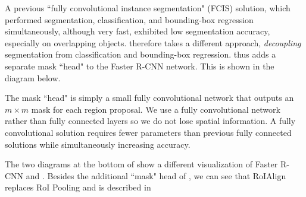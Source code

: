 A previous ``fully convolutional instance segmentation" (FCIS) solution, which performed segmentation, classification, and bounding-box regression simultaneously, although very fast, exhibited low segmentation accuracy, especially on overlapping objects. \maskrcnn therefore takes a different approach, \textit{decoupling} segmentation from classification and bounding-box regression. \maskrcnn thus adds a separate mask ``head" to the Faster R-CNN network. This is shown in the diagram below.

The mask ``head" is simply a small fully convolutional network that outputs an $m\times m$ mask for each region proposal. We use a fully convolutional network rather than fully connected layers so we do not lose spatial information. A fully convolutional solution requires fewer parameters than previous fully connected solutions while simultaneously increasing accuracy.

The two diagrams at the bottom of  show a different visualization of Faster R-CNN and \maskrcnn. Besides the additional ``mask" head of \maskrcnn, we can see that RoIAlign replaces RoI Pooling and is described in 

